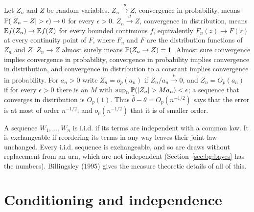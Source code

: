 Let $Z_n$ and $Z$ be random variables. $Z_n \xrightarrow{p} Z$, convergence in probability, means $\mathbb{P}(|Z_n - Z| > \epsilon) \to 0$ for every $\epsilon > 0$. $Z_n \xrightarrow{d} Z$, convergence in distribution, means $\mathbb{E} f(Z_n) \to \mathbb{E} f(Z)$ for every bounded continuous $f$, equivalently $F_n(z) \to F(z)$ at every continuity point of $F$, where $F_n$ and $F$ are the distribution functions of $Z_n$ and $Z$. $Z_n \to Z$ almost surely means $\mathbb{P}(Z_n \to Z) = 1$. Almost sure convergence implies convergence in probability, convergence in probability implies convergence in distribution, and convergence in distribution to a constant implies convergence in probability. For $a_n > 0$ write $Z_n = o_p(a_n)$ if $Z_n/a_n \xrightarrow{p} 0$, and $Z_n = O_p(a_n)$ if for every $\epsilon > 0$ there is an $M$ with $\sup_n \mathbb{P}(|Z_n| > Ma_n) < \epsilon$; a sequence that converges in distribution is $O_p(1)$. Thus $\hat\theta - \theta = O_p(n^{-1/2})$ says that the error is at most of order $n^{-1/2}$, and $o_p(n^{-1/2})$ that it is of smaller order.

A sequence $W_1, \dots, W_n$ is i.i.d. if its terms are independent with a common law. It is exchangeable if reordering its terms in any way leaves their joint law unchanged. Every i.i.d. sequence is exchangeable, and so are draws without replacement from an urn, which are not independent (Section~\ref{sec:bg:bayes} has the numbers). Billingsley (1995) gives the measure theoretic details of all of this.

\section{Conditioning and independence}\label{sec:bg:cond}



